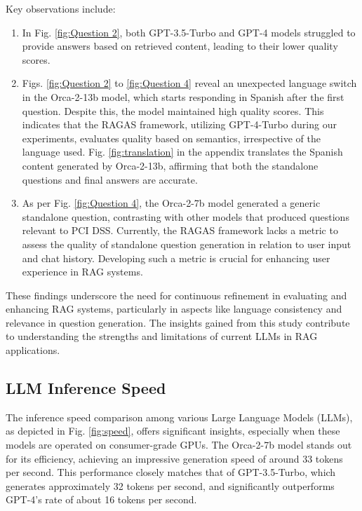\documentclass[runningheads]{llncs}
\begin{document}
Key observations include:

\begin{enumerate}
    \item In Fig. \ref{fig:Question 2}, both GPT-3.5-Turbo and GPT-4 models struggled to provide answers based on retrieved content, leading to their lower quality scores.


    \item Figs. \ref{fig:Question 2} to \ref{fig:Question 4} reveal an unexpected language switch in the Orca-2-13b model, which starts responding in Spanish after the first question. Despite this, the model maintained high quality scores. This indicates that the RAGAS framework, utilizing GPT-4-Turbo during our experiments, evaluates quality based on semantics, irrespective of the language used. Fig. \ref{fig:translation} in the appendix translates the Spanish content generated by Orca-2-13b, affirming that both the standalone questions and final answers are accurate.

    \item As per Fig. \ref{fig:Question 4}, the Orca-2-7b model generated a generic standalone question, contrasting with other models that produced questions relevant to PCI DSS. Currently, the RAGAS framework lacks a metric to assess the quality of standalone question generation in relation to user input and chat history. Developing such a metric is crucial for enhancing user experience in RAG systems.

\end{enumerate}

These findings underscore the need for continuous refinement in evaluating and enhancing RAG systems, particularly in aspects like language consistency and relevance in question generation. The insights gained from this study contribute to understanding the strengths and limitations of current LLMs in RAG applications.

\subsection{LLM Inference Speed} 
The inference speed comparison among various Large Language Models (LLMs), as depicted in Fig. \ref{fig:speed}, offers significant insights, especially when these models are operated on consumer-grade GPUs. The Orca-2-7b model stands out for its efficiency, achieving an impressive generation speed of around 33 tokens per second. This performance closely matches that of GPT-3.5-Turbo, which generates approximately 32 tokens per second, and significantly outperforms GPT-4's rate of about 16 tokens per second.
\end{document}
